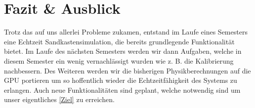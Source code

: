 \chapter{Fazit \& Ausblick}
	\begin{Spacing}{\mylinespace}
	Trotz das auf uns allerlei Probleme zukamen, entstand im Laufe eines Semesters eine Echtzeit Sandkastensimulation, die bereits grundlegende Funktionalität bietet. 
	Im Laufe des nächsten Semesters werden wir dann Aufgaben, welche in diesem Semester ein wenig vernachlässigt wurden wie z. B. die Kalibrierung nachbessern.
	Des Weiteren werden wir die bisherigen Physikberechnungen auf die GPU portieren um so hoffentlich wieder die Echtzeitfähigkeit des Systems zu erlangen.
	Auch neue Funktionalitäten sind geplant, welche notwendig sind um unser eigentliches \ref{Ziel} zu erreichen.
	
\end{Spacing}
\newpage
\clearpage
